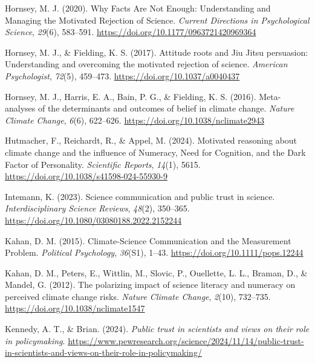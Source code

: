 \documentclass[
  jou,
  floatsintext,
  longtable,
  nolmodern,
  notxfonts,
  notimes,
  colorlinks=true,linkcolor=blue,citecolor=blue,urlcolor=blue]{apa7}
\newlength{\cslhangindent}
\newenvironment{CSLReferences}[2] %
 {\begin{list}{}{%
  \setlength{\itemindent}{0pt}
  \setlength{\leftmargin}{0pt}
  \setlength{\parsep}{0pt}
  \ifodd #1
   \setlength{\leftmargin}{\cslhangindent}
   \setlength{\itemindent}{-1\cslhangindent}
  \fi
  \setlength{\itemsep}{#2\baselineskip}}}
 {\end{list}}
\begin{document}
\begin{CSLReferences}{1}{0}
Hornsey, M. J. (2020). Why Facts Are Not Enough: Understanding and
Managing the Motivated Rejection of Science. \emph{Current Directions in
Psychological Science}, \emph{29}(6), 583--591.
\url{https://doi.org/10.1177/0963721420969364}

Hornsey, M. J., \& Fielding, K. S. (2017). Attitude roots and Jiu Jitsu
persuasion: Understanding and overcoming the motivated rejection of
science. \emph{American Psychologist}, \emph{72}(5), 459--473.
\url{https://doi.org/10.1037/a0040437}

Hornsey, M. J., Harris, E. A., Bain, P. G., \& Fielding, K. S. (2016).
Meta-analyses of the determinants and outcomes of belief in climate
change. \emph{Nature Climate Change}, \emph{6}(6), 622--626.
\url{https://doi.org/10.1038/nclimate2943}

Hutmacher, F., Reichardt, R., \& Appel, M. (2024). Motivated reasoning
about climate change and the influence of Numeracy, Need for Cognition,
and the Dark Factor of Personality. \emph{Scientific Reports},
\emph{14}(1), 5615. \url{https://doi.org/10.1038/s41598-024-55930-9}

Intemann, K. (2023). Science communication and public trust in science.
\emph{Interdisciplinary Science Reviews}, \emph{48}(2), 350--365.
\url{https://doi.org/10.1080/03080188.2022.2152244}

Kahan, D. M. (2015). Climate-Science Communication and the Measurement
Problem. \emph{Political Psychology}, \emph{36}(S1), 1--43.
\url{https://doi.org/10.1111/pops.12244}

Kahan, D. M., Peters, E., Wittlin, M., Slovic, P., Ouellette, L. L.,
Braman, D., \& Mandel, G. (2012). The polarizing impact of science
literacy and numeracy on perceived climate change risks. \emph{Nature
Climate Change}, \emph{2}(10), 732--735.
\url{https://doi.org/10.1038/nclimate1547}

Kennedy, A. T., \& Brian. (2024). \emph{Public trust in scientists and
views on their role in policymaking}.
\url{https://www.pewresearch.org/science/2024/11/14/public-trust-in-scientists-and-views-on-their-role-in-policymaking/}


\end{CSLReferences}
\end{document}
